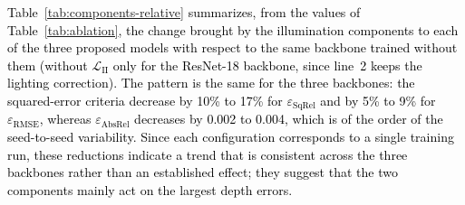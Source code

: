 \documentclass[a4paper,fleqn]{cas-dc}
\begin{document}
%
\textcolor{black}{ Table~\ref{tab:components-relative} summarizes, from the values of Table~\ref{tab:ablation}, the change brought by the illumination components to each of the three proposed models with respect to the same backbone trained without them (without $\mathcal{L}_\textrm{II}$ only for the ResNet-18 backbone, since line~2 keeps the lighting correction). The pattern is the same for the three backbones: the squared-error criteria decrease by 10\% to 17\% for $\varepsilon_\textrm{SqRel}$ and by 5\% to 9\% for $\varepsilon_\textrm{RMSE}$, whereas $\varepsilon_\textrm{AbsRel}$ decreases by 0.002 to 0.004, which is of the order of the seed-to-seed variability. Since each configuration corresponds to a single training run, these reductions indicate a trend that is consistent across the three backbones rather than an established effect; they suggest that the two components mainly act on the largest depth errors.}
\end{document}
